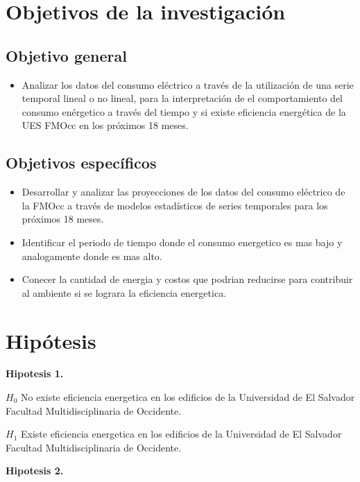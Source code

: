 \documentclass[12pt,letterpaper]{report}
\begin{document}
\newpage
\section{Objetivos de la investigación}
\subsection{Objetivo general}

\begin{itemize}
\item Analizar los datos del consumo eléctrico a través de la utilización de una serie
temporal lineal o no lineal, para la interpretación de el comportamiento del consumo enérgetico a través del tiempo y si existe eficiencia energética de la UES FMOcc en los próximos 18 meses.
\end{itemize}

\subsection{Objetivos específicos}

\begin{itemize}
\item Desarrollar y analizar las proyecciones de los datos del consumo eléctrico de la
FMOcc a través de modelos estadísticos de series temporales para los próximos 18
meses.

\item Identificar el periodo de tiempo donde el consumo energetico es mas bajo y analogamente donde es mas alto.

\item Conecer la cantidad de energia y costos que podrian reducirse para contribuir al ambiente si se lograra la eficiencia energetica.  

\end{itemize}

\newpage
\section{Hipótesis}
\textbf{ Hipotesis 1.} 

$H_0$ No existe eficiencia energetica en los edificios de la Universidad de El Salvador Facultad Multidisciplinaria de Occidente.

$H_1$ Existe eficiencia energetica en los edificios de la Universidad de El Salvador Facultad Multidisciplinaria de Occidente.

\textbf{ Hipotesis 2.}
\end{document}

